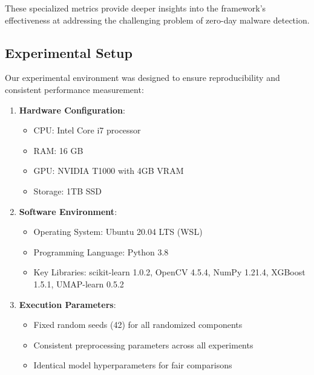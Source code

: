 These specialized metrics provide deeper insights into the framework's effectiveness at addressing the challenging problem of zero-day malware detection.

\subsection{Experimental Setup}
\label{subsec:experimental-setup}

Our experimental environment was designed to ensure reproducibility and consistent performance measurement:

\begin{enumerate}
    \item \textbf{Hardware Configuration}:
    \begin{itemize}
        \item CPU: Intel Core i7 processor
        \item RAM: 16 GB
        \item GPU: NVIDIA T1000 with 4GB VRAM
        \item Storage: 1TB SSD
    \end{itemize}
    
    \item \textbf{Software Environment}:
    \begin{itemize}
        \item Operating System: Ubuntu 20.04 LTS (WSL)
        \item Programming Language: Python 3.8
        \item Key Libraries: scikit-learn 1.0.2, OpenCV 4.5.4, NumPy 1.21.4, XGBoost 1.5.1, UMAP-learn 0.5.2
    \end{itemize}
    
    \item \textbf{Execution Parameters}:
    \begin{itemize}
        \item Fixed random seeds (42) for all randomized components
        \item Consistent preprocessing parameters across all experiments
        \item Identical model hyperparameters for fair comparisons
    \end{itemize}
\end{enumerate}

